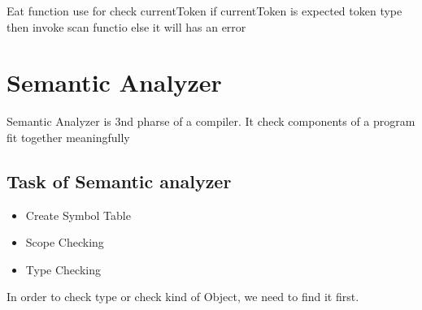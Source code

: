 \documentclass[12pt, a4paper]{article}
\begin{document}
Eat function use for check currentToken if currentToken is expected token type then invoke scan functio else it will has an error\\


\section{Semantic Analyzer}
Semantic Analyzer is 3nd pharse of a compiler. It check components of a program fit together meaningfully\\
\subsection*{Task of Semantic analyzer}
\begin{itemize}
	\item Create Symbol Table
	\item Scope Checking
	\item Type Checking
\end{itemize}




% 

In order to check type or check kind of Object, we need to find it first.






\end{document}
